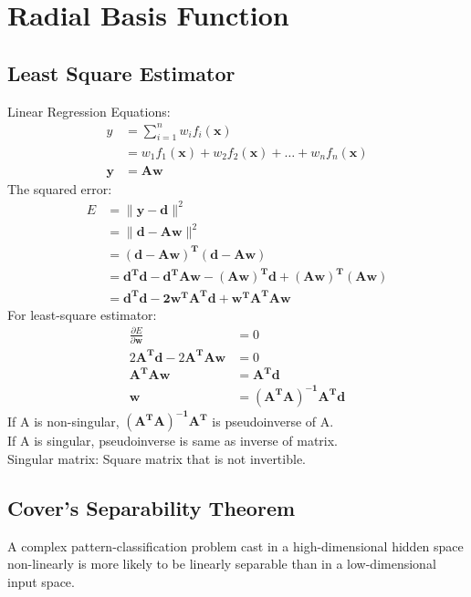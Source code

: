\chapter{Radial Basis Function}

\section{Least Square Estimator}
Linear Regression Equations:
\begin{equation*}
\begin{split}
y &= \sum_{i=1}^{n} w_i f_i(\mathbf{x}) \\
&= w_1 f_1(\mathbf{x}) + w_2 f_2(\mathbf{x}) + \ldots + w_n f_n(\mathbf{x})  \\
\mathbf{y} &= \mathbf{Aw}
\end{split}
\end{equation*}
The squared error:
\begin{equation*}
\begin{split}
E &=\| \mathbf{y -d} \|^{2} \\
&= \| \mathbf{d - Aw} \|^{2} \\
&= \mathbf{(d-Aw)^{T}(d-Aw)} \\
&= \mathbf{d^{T}d - d^{T}Aw - (Aw)^{T}d + (Aw)^{T}(Aw)} \\
&= \mathbf{d^{T}d - 2w^{T}A^{T}d + w^{T}A^{T}Aw}
\end{split}
\end{equation*}
For least-square estimator:
\begin{equation*}
\begin{split}
\frac{\partial E}{\partial \mathbf{w}} &= 0 \\
2\mathbf{A^{T}d} - 2\mathbf{A^{T}Aw} &= 0 \\
\mathbf{A^{T}Aw} &= \mathbf{A^{T}d} \\
\mathbf{w} &= \mathbf{(A^{T}A)^{-1}A^{T}d}
\end{split}
\end{equation*}
If A is non-singular, $\mathbf{(A^{T}A)^{-1}A^{T}}$ is pseudoinverse of A. \\
If A is singular, pseudoinverse is same as inverse of matrix. \\
Singular matrix: Square matrix that is not invertible.

\section{Cover's Separability Theorem}
A complex pattern-classification problem cast in a high-dimensional hidden space non-linearly is more likely to be linearly separable than in a low-dimensional input space.

